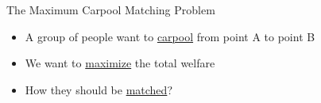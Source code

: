 \begin{frame}{The Maximum Carpool Matching Problem}
\begin{itemize}[<+>]
	\item A group of people want to \underline{carpool} from point A to point B
	\item We want to \underline{maximize} the total welfare
	\item How they should be \underline{matched}?
\end{itemize}

\centering


\end{frame}